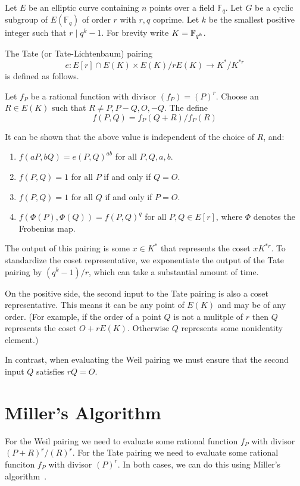 Let $E$ be an elliptic curve containing $n$ points over a field $\mathbb{F}_q$.
Let $G$ be a cyclic subgroup of $E(\mathbb{F}_q)$ of order $r$ with $r, q$
coprime. Let $k$ be the smallest positive integer such that $r \mid q^k - 1$.
For brevity write $K = \mathbb{F}_{q^k}$.

The Tate (or Tate-Lichtenbaum) pairing
\[
e : E[r] \cap E(K) \times
E(K) / r E(K) \rightarrow
K^* / K^{*r}
\]
is defined as follows.

Let $f_P$ be a rational function with divisor $(f_P) = (P)^r$.
Choose an $R\in E(K)$ such that $R \ne P, P-Q, O, -Q$. The define
\[
f(P, Q) = f_P (Q + R) / f_P (R)
\]

It can be shown that the above value is independent of the choice of $R$,
and:
\begin{enumerate}
\item
$f(a P, b Q) = e(P, Q)^{a b}$ for all $P, Q, a, b$.
\item
$f(P,Q) = 1$ for all $P$ if and only if $Q = O$.
\item
$f(P,Q) = 1$ for all $Q$ if and only if $P = O$.
\item
$f(\Phi(P),\Phi(Q)) = f(P,Q)^{q}$ for all $P,Q \in E[r]$,
where $\Phi$ denotes the Frobenius map.
\end{enumerate}

The output of this pairing is some $x \in K^*$
that represents the coset $x K^{*r}$. To standardize the coset
representative, we exponentiate the output of the Tate pairing
by $(q^k - 1) / r$, which can take a substantial amount of time.

On the positive side, the second input to the Tate pairing is also a coset
representative. This means it can be any point of $E(K)$ and may
be of any order. (For example,
if the order of a point $Q$ is not a mulitple of $r$ then $Q$ represents
the coset $O + r E(K)$. Otherwise $Q$ represents some nonidentity
element.)

In contrast, when evaluating the Weil pairing we must ensure that the second
input $Q$ satisfies $r Q = O$.

\section {Miller's Algorithm}

For the Weil pairing we need to evaluate some rational function
$f_P$ with divisor $(P+R)^r /(R)^r$.
For the Tate pairing we need to evaluate some rational funciton
$f_P$ with divisor $(P)^r$.
In both cases, we can do this using Miller's algorithm~\cite{miller}.

